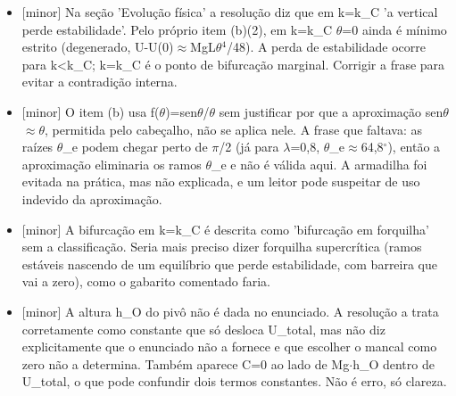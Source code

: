 \documentclass{article}%
\begin{document}
\begin{itemize}%
\item%
{[}minor{]} Na seção 'Evolução física' a resolução diz que em k=k\_C 'a vertical perde estabilidade'. Pelo próprio item (b)(2), em k=k\_C $\theta$=0 ainda é mínimo estrito (degenerado, U-U(0)$\approx$MgL$\theta$$^{4}$/48). A perda de estabilidade ocorre para k<k\_C; k=k\_C é o ponto de bifurcação marginal. Corrigir a frase para evitar a contradição interna.%
\item%
{[}minor{]} O item (b) usa f($\theta$)=sen$\theta$/$\theta$ sem justificar por que a aproximação sen$\theta$$\approx$$\theta$, permitida pelo cabeçalho, não se aplica nele. A frase que faltava: as raízes $\theta$\_e podem chegar perto de $\pi$/2 (já para $\lambda$=0,8, $\theta$\_e$\approx$64,8$^\circ$), então a aproximação eliminaria os ramos $\theta$\_e e não é válida aqui. A armadilha foi evitada na prática, mas não explicada, e um leitor pode suspeitar de uso indevido da aproximação.%
\item%
{[}minor{]} A bifurcação em k=k\_C é descrita como 'bifurcação em forquilha' sem a classificação. Seria mais preciso dizer forquilha supercrítica (ramos estáveis nascendo de um equilíbrio que perde estabilidade, com barreira que vai a zero), como o gabarito comentado faria.%
\item%
{[}minor{]} A altura h\_O do pivô não é dada no enunciado. A resolução a trata corretamente como constante que só desloca U\_total, mas não diz explicitamente que o enunciado não a fornece e que escolher o mancal como zero não a determina. Também aparece C=0 ao lado de Mg$\cdot$h\_O dentro de U\_total, o que pode confundir dois termos constantes. Não é erro, só clareza.%
\end{itemize}%
\end{document}

